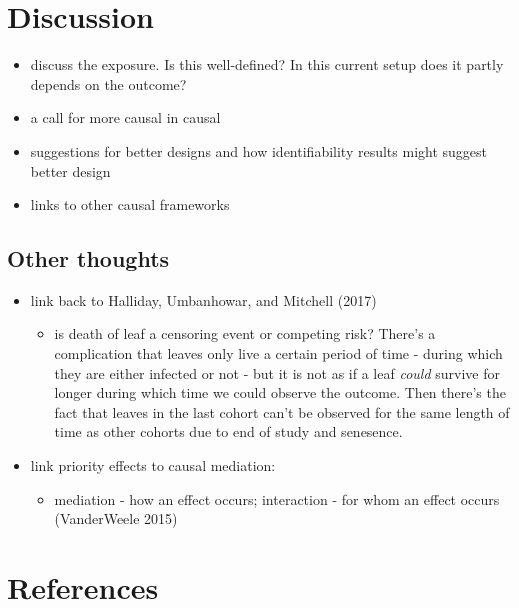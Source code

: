 \documentclass[]{article}
\providecommand{\tightlist}{%
  \setlength{\itemsep}{0pt}\setlength{\parskip}{0pt}}
\begin{document}
\hypertarget{discussion}{%
\section{Discussion}\label{discussion}}

\begin{itemize}
\tightlist
\item
  discuss the exposure. Is this well-defined? In this current setup does
  it partly depends on the outcome?
\item
  a call for more causal in causal
\item
  suggestions for better designs and how identifiability results might
  suggest better design
\item
  links to other causal frameworks
\end{itemize}

\hypertarget{other-thoughts}{%
\subsection{Other thoughts}\label{other-thoughts}}

\begin{itemize}
\tightlist
\item
  link back to Halliday, Umbanhowar, and Mitchell (2017)

  \begin{itemize}
  \tightlist
  \item
    is death of leaf a censoring event or competing risk? There's a
    complication that leaves only live a certain period of time - during
    which they are either infected or not - but it is not as if a leaf
    \emph{could} survive for longer during which time we could observe
    the outcome. Then there's the fact that leaves in the last cohort
    can't be observed for the same length of time as other cohorts due
    to end of study and senesence.
  \end{itemize}
\item
  link priority effects to causal mediation:

  \begin{itemize}
  \tightlist
  \item
    mediation - how an effect occurs; interaction - for whom an effect
    occurs (VanderWeele 2015)
  \end{itemize}
\end{itemize}

\hypertarget{references}{%
\section*{References}\label{references}}
\end{document}
